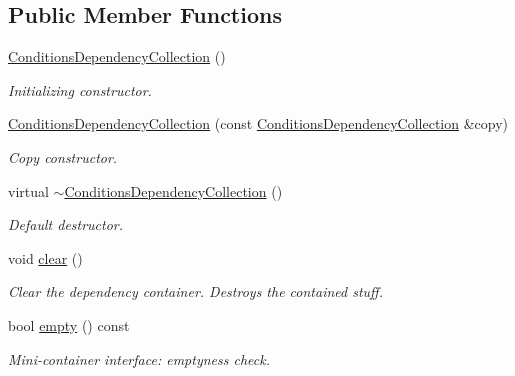 \subsection*{Public Member Functions}
\begin{DoxyCompactItemize}
\item 
\hyperlink{class_d_d4hep_1_1_conditions_1_1_conditions_dependency_collection_af714a3d709ece6040aea1e4d65645015}{ConditionsDependencyCollection} ()
\begin{DoxyCompactList}\small\item\em Initializing constructor. \item\end{DoxyCompactList}\item 
\hyperlink{class_d_d4hep_1_1_conditions_1_1_conditions_dependency_collection_a244d8717b93fb02a5899b00556a16da4}{ConditionsDependencyCollection} (const \hyperlink{class_d_d4hep_1_1_conditions_1_1_conditions_dependency_collection}{ConditionsDependencyCollection} \&copy)
\begin{DoxyCompactList}\small\item\em Copy constructor. \item\end{DoxyCompactList}\item 
virtual \hyperlink{class_d_d4hep_1_1_conditions_1_1_conditions_dependency_collection_ad09c3071e28a0cae78a9bc8945331619}{$\sim$ConditionsDependencyCollection} ()
\begin{DoxyCompactList}\small\item\em Default destructor. \item\end{DoxyCompactList}\item 
void \hyperlink{class_d_d4hep_1_1_conditions_1_1_conditions_dependency_collection_ace3a46d90c1770071d31ae203dadf518}{clear} ()
\begin{DoxyCompactList}\small\item\em Clear the dependency container. Destroys the contained stuff. \item\end{DoxyCompactList}\item 
bool \hyperlink{class_d_d4hep_1_1_conditions_1_1_conditions_dependency_collection_a0570fdbe73d69513617d65f905309ce4}{empty} () const 
\begin{DoxyCompactList}\small\item\em Mini-\/container interface: emptyness check. \item\end{DoxyCompactList}\item 

\end{DoxyCompactItemize}
